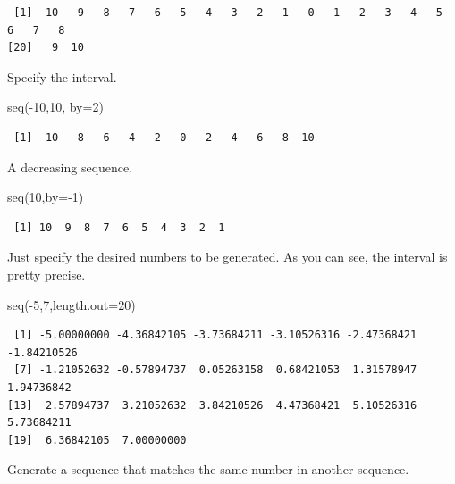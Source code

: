 \documentclass[
  letterpaper,
]{book}
\newenvironment{Shaded}{\begin{snugshade}}{\end{snugshade}}
\newcommand{\AttributeTok}[1]{\textcolor[rgb]{0.40,0.45,0.13}{#1}}
\newcommand{\DecValTok}[1]{\textcolor[rgb]{0.68,0.00,0.00}{#1}}
\newcommand{\FunctionTok}[1]{\textcolor[rgb]{0.28,0.35,0.67}{#1}}
\newcommand{\NormalTok}[1]{\textcolor[rgb]{0.00,0.23,0.31}{#1}}
\newcommand{\SpecialCharTok}[1]{\textcolor[rgb]{0.37,0.37,0.37}{#1}}
\begin{document}
\begin{verbatim}
 [1] -10  -9  -8  -7  -6  -5  -4  -3  -2  -1   0   1   2   3   4   5   6   7   8
[20]   9  10
\end{verbatim}

Specify the interval.

\begin{Shaded}
\begin{Highlighting}[]
\FunctionTok{seq}\NormalTok{(}\SpecialCharTok{{-}}\DecValTok{10}\NormalTok{,}\DecValTok{10}\NormalTok{, }\AttributeTok{by=}\DecValTok{2}\NormalTok{)}
\end{Highlighting}
\end{Shaded}

\begin{verbatim}
 [1] -10  -8  -6  -4  -2   0   2   4   6   8  10
\end{verbatim}

A decreasing sequence.

\begin{Shaded}
\begin{Highlighting}[]
\FunctionTok{seq}\NormalTok{(}\DecValTok{10}\NormalTok{,}\AttributeTok{by=}\SpecialCharTok{{-}}\DecValTok{1}\NormalTok{)}
\end{Highlighting}
\end{Shaded}

\begin{verbatim}
 [1] 10  9  8  7  6  5  4  3  2  1
\end{verbatim}

Just specify the desired numbers to be generated. As you can see, the
interval is pretty precise.

\begin{Shaded}
\begin{Highlighting}[]
\FunctionTok{seq}\NormalTok{(}\SpecialCharTok{{-}}\DecValTok{5}\NormalTok{,}\DecValTok{7}\NormalTok{,}\AttributeTok{length.out=}\DecValTok{20}\NormalTok{)}
\end{Highlighting}
\end{Shaded}

\begin{verbatim}
 [1] -5.00000000 -4.36842105 -3.73684211 -3.10526316 -2.47368421 -1.84210526
 [7] -1.21052632 -0.57894737  0.05263158  0.68421053  1.31578947  1.94736842
[13]  2.57894737  3.21052632  3.84210526  4.47368421  5.10526316  5.73684211
[19]  6.36842105  7.00000000
\end{verbatim}

Generate a sequence that matches the same number in another sequence.
\end{document}
